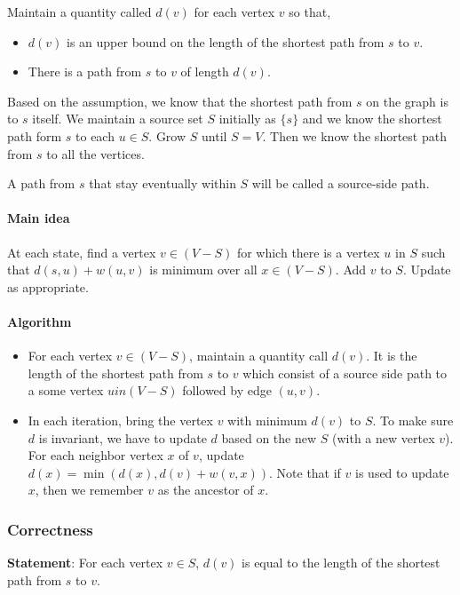 Maintain a quantity called $d(v)$ for each vertex $v$ so that,
\begin{itemize}
	\item $d(v)$ is an upper bound on the length of the shortest path from $s$ to $v$.
	\item There is a path from $s$ to $v$ of length $d(v)$.
\end{itemize}

Based on the assumption, we know that the shortest path from $s$ on the graph is to $s$ itself. We maintain a source set $S$ initially as $\{s\}$ and we know the shortest path form $s$ to each $u \in S$. Grow $S$ until $S = V$. Then we know the shortest path from $s$ to all the vertices.

A path from $s$ that stay eventually within $S$ will be called a source-side path.

\paragraph{Main idea}
At each state, find a vertex $v \in (V-S)$ for which there is a vertex $u$ in $S$ such that $d(s, u) + w(u, v)$ is minimum over all $x \in (V-S)$. Add $v$ to $S$. Update as appropriate.

\paragraph{Algorithm} 
\begin{itemize}
	\item For each vertex $v \in (V-S)$, maintain a quantity call $d(v)$. It is the length of the shortest path from $s$ to $v$ which consist of a source side path to a some vertex $u in (V-S)$ followed by edge $(u,v)$.
	\item In each iteration, bring the vertex $v$ with minimum $d(v)$ to $S$. To make sure $d$ is invariant, we have to update $d$ based on the new $S$ (with a new vertex $v$). For each neighbor vertex $x$ of $v$, update $d(x) = \min(d(x), d(v) + w(v, x))$. Note that if $v$ is used to update $x$, then we remember $v$ as the ancestor of $x$.
\end{itemize}

\subsubsection{Correctness}
\textbf{Statement}: For each vertex $v \in S$, $d(v)$ is equal to the length of the shortest path from $s$ to $v$.

